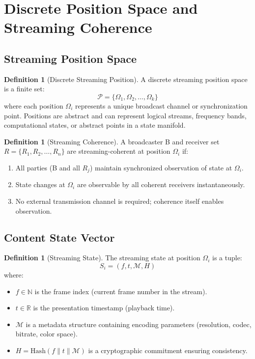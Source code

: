 \documentclass[twocolumn,10pt,a4paper]{article}
\theoremstyle{plain}
\theoremstyle{definition}
\newtheorem{definition}[theorem]{Definition}
\begin{document}
\section{Discrete Position Space and Streaming Coherence}
\label{sec:model}

\subsection{Streaming Position Space}

\begin{definition}[Discrete Streaming Position]
A discrete streaming position space is a finite set:
\[
\mathcal{P} = \{\Omega_1, \Omega_2, \ldots, \Omega_k\}
\]
where each position $\Omega_i$ represents a unique broadcast channel or synchronization point. Positions are abstract and can represent logical streams, frequency bands, computational states, or abstract points in a state manifold.
\end{definition}

\begin{definition}[Streaming Coherence]
A broadcaster B and receiver set $R = \{R_1, R_2, \ldots, R_n\}$ are streaming-coherent at position $\Omega_i$ if:
\begin{enumerate}
\item All parties (B and all $R_j$) maintain synchronized observation of state at $\Omega_i$.
\item State changes at $\Omega_i$ are observable by all coherent receivers instantaneously.
\item No external transmission channel is required; coherence itself enables observation.
\end{enumerate}
\end{definition}

\subsection{Content State Vector}

\begin{definition}[Streaming State]
The streaming state at position $\Omega_i$ is a tuple:
\[
S_i = (f, t, \mathcal{M}, H)
\]
where:
\begin{itemize}
\item $f \in \mathbb{N}$ is the frame index (current frame number in the stream).
\item $t \in \mathbb{R}$ is the presentation timestamp (playback time).
\item $\mathcal{M}$ is a metadata structure containing encoding parameters (resolution, codec, bitrate, color space).
\item $H = \mathrm{Hash}(f \| t \| \mathcal{M})$ is a cryptographic commitment ensuring consistency.
\end{itemize}
\end{definition}
\end{document}
